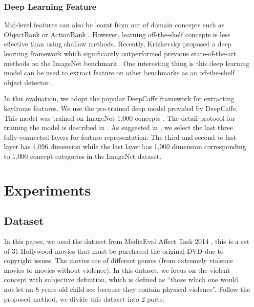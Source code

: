 \documentclass[twocolumn]{bmcart}%
\begin{document}
\subsubsection{Deep Learning Feature}
Mid-level features can also be learnt from out of domain concepts such as ObjectBank \cite{15} or ActionBank \cite{23}. However, learning off-the-shelf concepts is less effective than using shallow methods. Recently, Krizhevsky \cite{krizhevsky2012imagenet} proposed a deep learning framework which significantly outperformed previous state-of-the-art methods on the ImageNet benchmark \cite{deng2009imagenet}. One interesting thing is this deep learning model can be used to extract feature on other benchmarks as an off-the-shelf object detector \cite{donahue2013decaf}. 

In this evaluation, we adopt the popular DeepCaffe \cite{jia2014caffe} framework for extracting keyframe features. We use the pre-trained deep model provided by DeepCaffe. This model was trained on ImageNet 1,000 concepts \cite{deng2009imagenet}. The detail protocol for training the model is described in \cite{jia2014caffe}. As suggested in \cite{krizhevsky2012imagenet}, we select the last three fully-connected layers for feature representation. The third and second to last layer has 4,096 dimension while the last layer has 1,000 dimension corresponding to 1,000 concept categories in the ImageNet dataset.

\section{Experiments}
\subsection{Dataset}
In this paper, we used the dataset from MediaEval  Affect Task 2014 \cite{demarty2014benchmarking}, this is a set of 31 Hollywood movies that must be purchased the original DVD due to copyright issues. The movies are of different genres (from extremely violence movies to movies without violence). In this dataset, we focus on the violent concept with subjective definition, which is defined as “those which one would not let an 8 years old child see because they contain physical violence”. Follow the proposed method, we divide this dataset into 2 parts:
\end{document}

